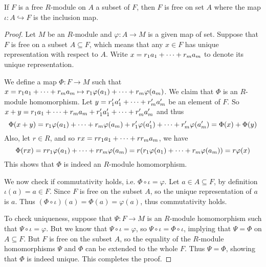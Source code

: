 \medskip

\begin{lem} 
    If $F$ is a free $R$-module on $A$ a subset of $F$, then $F$ is free on set $A$ where the map $\iota:A \hookrightarrow F$ is the inclusion map.
\end{lem}
\begin{proof}
    Let $M$ be an $R$-module and $\varphi:A\to M$ is a given map of set. Suppose that $F$ is free on a subset $A\subseteq F$, which means that any $x\in F$ has unique representation with respect to $A$. Write $x= r_1a_1 +\dots+ r_m a_m$ to denote its unique representation.

    We define a map $\Phi:F\to M$ such that $x=r_1a_1 +\dots+ r_ma_m \mapsto r_1\varphi(a_1) +\dots+ r_m\varphi(a_m)$. We claim that $\Phi$ is an $R$-module homomorphism. Let $y=r'_1a'_1 +\dots+ r'_ma'_m$ be an element of $F$. So $x+y = r_1a_1 +\dots+ r_ma_m + r'_1a'_1 +\dots+ r'_ma'_m$ and thus
    \[\Phi(x+y) = r_1\varphi(a_1) +\dots+ r_m\varphi(a_m) + r'_1\varphi(a'_1) +\dots+ r'_m\varphi(a'_m) = \Phi(x) + \Phi(y)\]
    Also, let $r\in R$, and so $rx = rr_1 a_1 +\dots+ rr_ma_m$, we have
    \[\Phi(rx) = rr_1 \varphi(a_1)+\dots+ rr_m \varphi(a_m) = r(r_1 \varphi(a_1)+\dots+ r_m \varphi(a_m)) = r\varphi(x)\]
    This shows that $\Phi$ is indeed an $R$-module homomorphism. 
    
    We now check if commutativity holds, i.e. $\Phi\circ \iota = \varphi$. Let $a\in A\subseteq F$, by definition $\iota(a) = a\in F$. Since $F$ is free on the subset $A$, so the unique representation of $a$ is $a$. Thus $(\Phi\circ\iota)(a) = \Phi(a) = \varphi(a)$, thus commutativity holds.

    To check uniqueness, suppose that $\Psi:F\to M$ is an $R$-module homomorphism such that $\Psi\circ \iota = \varphi$. But we know that $\Psi\circ \iota = \varphi$, so $\Psi\circ \iota = \Phi \circ \iota$, implying that $\Psi = \Phi$ on $A\subseteq F$. But $F$ is free on the subset $A$, so the equality of the $R$-module homomorphisms $\Psi$ and $\Phi$ can be extended to the whole $F$. Thus $\Psi = \Phi$, showing that $\Phi$ is indeed unique. This completes the proof.
\end{proof}

